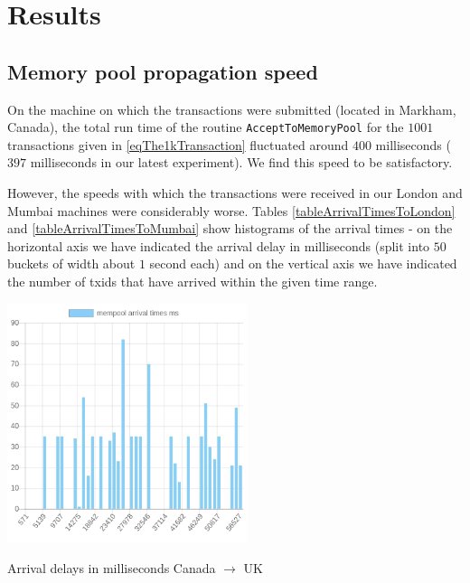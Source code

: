 \documentclass{article}
\begin{document}
\section{Results}
\subsection{Memory pool propagation speed}
On the machine on which the transactions were submitted (located in Markham, Canada), the total run time of the routine \verb|AcceptToMemoryPool| for the $1001$ transactions given in \eqref{eqThe1kTransaction} fluctuated around $400$ milliseconds ($397$ milliseconds in our latest experiment). We find this speed to be satisfactory.

However, the speeds with which the transactions were received in our London and Mumbai machines were considerably worse. Tables \ref{tableArrivalTimesToLondon} and \ref{tableArrivalTimesToMumbai} show histograms of the arrival times - on the horizontal axis we have indicated the arrival delay in milliseconds (split into $50$ buckets of width about $1$ second each) and on the vertical axis we have indicated the number of txids that have arrived within the given time range.
\begin{table}
	\begin{center}
	\includegraphics[width = 7cm]{./images/mempoolArrivals18_130_88_126.png}
	\end{center}
	\caption{\label{tableArrivalTimesToLondon} Arrival delays in milliseconds Canada $ \to$ UK}
\end{table}
\end{document}
